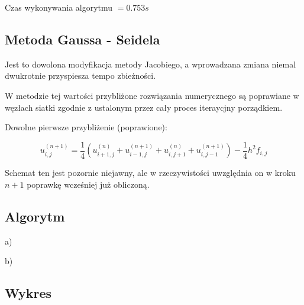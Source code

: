 Czas wykonywania algorytmu $ = 0.753 s$


\subsection{Metoda Gaussa - Seidela	}

Jest to dowolona modyfikacja metody Jacobiego, a wprowadzana zmiana niemal dwukrotnie przyspiesza tempo zbieżności.

W metodzie tej wartości przybliżone rozwiązania numerycznego są poprawiane w węzłach siatki zgodnie z ustalonym przez cały proces iteraycjny porządkiem.

Dowolne pierwsze przybliżenie (poprawione):

$$u_{i,j}^{(n+1)} = \frac{1}{4}(u_{i+1,j}^{(n)} + u_{i-1,j}^{(n+1)} + u_{i,j+1}^{(n)} + u_{i,j-1}^{(n+1)}) - \frac{1}{4}h^2f_{i,j}$$

Schemat ten jest pozornie niejawny, ale w rzeczywistości uwzględnia on w kroku $n+1$ poprawkę wcześniej już obliczoną.

\subsection{Algorytm}

a)

b)

\subsection{Wykres}




